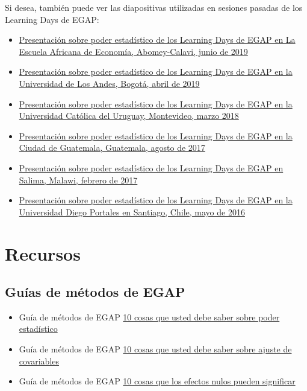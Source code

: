 \documentclass[12pt,spanish,]{book}
\begin{document}
Si desea, también puede ver las diapositivas utilizadas en sesiones pasadas de los Learning Days de EGAP:

\begin{itemize}
\item
  \href{https://egap.github.io/learningdays-resources/Slides/Examples/power-benin.pdf}{Presentación sobre poder estadístico de los Learning Days de EGAP en La Escuela Africana de Economía, Abomey-Calavi, junio de 2019}
\item
  \href{https://egap.github.io/learningdays-resources/Slides/Examples/power-bogota.pdf}{Presentación sobre poder estadístico de los Learning Days de EGAP en la Universidad de Los Andes, Bogotá, abril de 2019}
\item
  \href{https://egap.github.io/learningdays-resources/Slides/Examples/power-montevideo.pdf}{Presentación sobre poder estadístico de los Learning Days de EGAP en la Universidad Católica del Uruguay, Montevideo, marzo 2018}
\item
  \href{https://egap.github.io/learningdays-resources/Slides/Examples/power-guatemala.html}{Presentación sobre poder estadístico de los Learning Days de EGAP en la Ciudad de Guatemala, Guatemala, agosto de 2017}
\item
  \href{https://egap.github.io/learningdays-resources/Slides/Examples/power-malawi.pdf}{Presentación sobre poder estadístico de los Learning Days de EGAP en Salima, Malawi, febrero de 2017}
\item
  \href{https://egap.github.io/learningdays-resources/Slides/Examples/power-santiago.pdf}{Presentación sobre poder estadístico de los Learning Days de EGAP en la Universidad Diego Portales en Santiago, Chile, mayo de 2016}
\end{itemize}

\hypertarget{recursos-5}{%
\section{Recursos}\label{recursos-5}}

\hypertarget{guuxedas-de-muxe9todos-de-egap-4}{%
\subsection{Guías de métodos de EGAP}\label{guuxedas-de-muxe9todos-de-egap-4}}

\begin{itemize}
\item
  Guía de métodos de EGAP \href{https://egap.org/resource/10-things-you-need-know-about-statistical-power/}{10 cosas que usted debe saber sobre poder estadístico}
\item
  Guía de métodos de EGAP \href{https://egap.org/resource/10-things-to-know-about-covariate-adjustment/}{10 cosas que usted debe saber sobre ajuste de covariables}
\item
  Guía de métodos de EGAP \href{https://egap.org/resource/10-things-your-null-result-might-mean/}{10 cosas que los efectos nulos pueden significar}
\end{itemize}
\end{document}
